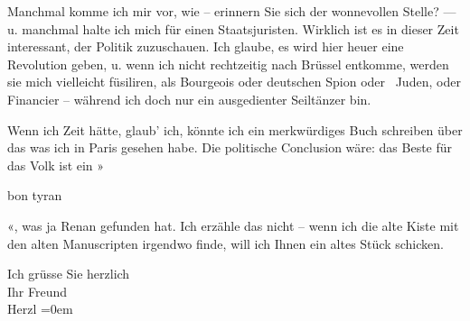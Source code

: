                Manchmal komme ich mir vor, wie \label{K_L03826-3v}\label{K_L03826-3} – erinnern Sie sich der wonnevollen
               Stelle? — u. manchmal halte ich mich für einen Staatsjuristen. Wirklich ist es in
               dieser Zeit interessant, der Politik zuzuschauen. Ich glaube, es wird hier heuer eine
               Revolution geben, u. wenn ich nicht rechtzeitig nach Brüssel entkomme, werden sie mich vielleicht füsiliren, als Bourgeois oder
               deutschen Spion oder  Juden, oder Financier –
               während ich doch nur ein ausgedienter Seiltänzer bin.\pend
           
\pstart
           Wenn ich Zeit hätte, glaub' ich, {\pb}könnte
               ich ein merkwürdiges Buch schreiben über das was ich in Paris gesehen habe. Die politische Conclusion wäre: das Beste
               für das Volk ist ein »\begin{otherlanguage}{french}bon tyran\end{otherlanguage}«, was ja Renan gefunden hat. Ich erzähle das nicht
                  \label{K_L03826-4v}\label{K_L03826-4} – wenn ich die alte Kiste mit
               den alten Manuscripten irgendwo finde, will ich Ihnen ein altes Stück schicken.\pend
           
\pstart
           Ich grüsse Sie herzlich{\\[\baselineskip]} Ihr Freund{\\[\baselineskip]}\spacefill\mbox{Herzl}\pend
           \leftskip=0em{}\endnumbering{}
\begin{anhang}
\end{anhang}
      